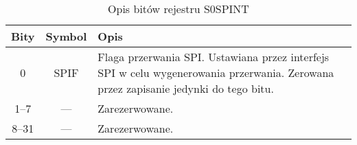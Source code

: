 \begin{itemize}
    \begin{table}[H]
\centering
\caption{Opis bitów rejestru S0SPINT}
\vspace{0.5em}
\renewcommand{\arraystretch}{1.2}
\begin{tabular}{|c|c|p{9.5cm}|}
\hline
\textbf{Bity} & \textbf{Symbol} & \textbf{Opis} \\
\hline
0     & SPIF       & Flaga przerwania SPI. Ustawiana przez interfejs SPI w celu wygenerowania przerwania. \newline Zerowana przez zapisanie jedynki do tego bitu. \newline \\
\hline
1–7   & —          & Zarezerwowane.\\
\hline
8–31  & —          & Zarezerwowane. \\
\hline
\end{tabular}
\end{table}
\end{itemize}

